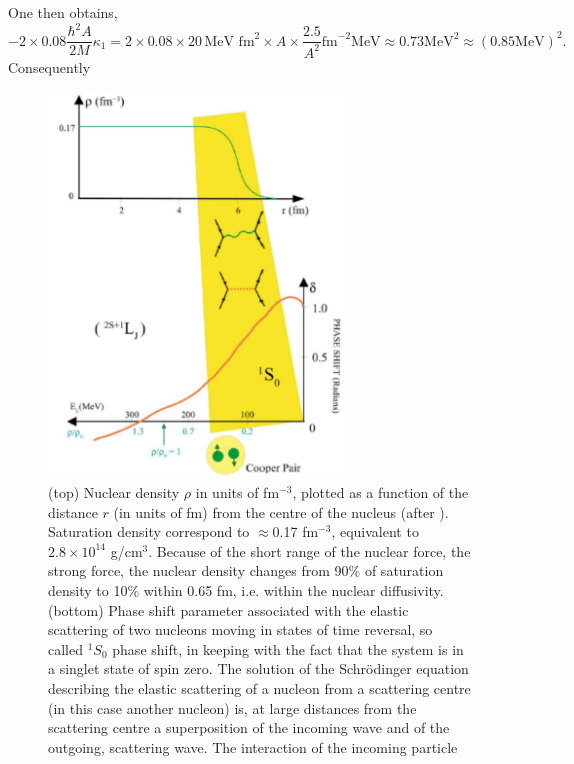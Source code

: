  One then obtains,
\begin{equation*}
-2\times 0.08\frac{\hbar^2A}{2M}\kappa_1=2\times 0.08\times 20\,\text{MeV fm}^2\times A\times\frac{2.5}{A^2}\text{fm}^{-2}\text{MeV}\approx 0.73 \text{MeV}^2\approx (0.85\text{MeV})^2.
\end{equation*} 
 Consequently
  \begin{figure}
  \centerline{\includegraphics*[width=0.7\textwidth,angle=0]{nutshell/figs/fig1F1.pdf}}\caption{(top) Nuclear density $\rho$ in units of fm$^{-3}$, plotted as a function of the distance $r$ (in units of fm) from
    the centre of the nucleus (after \cite{Bohr:69}). Saturation density correspond to $\approx$0.17 fm$^{-3}$, equivalent to $2.8\times 10^{14}$ g/cm$^3$. Because of the short range of
    the nuclear force, the strong force, the nuclear density changes from 90\% of saturation density to 10\% within 0.65 fm, i.e. within the
    nuclear diffusivity. (bottom) Phase shift  parameter associated with the elastic scattering of two nucleons moving in states of time reversal, so
    called $^1S_0$ phase shift, in keeping with the fact that the system is in a singlet state of spin zero. The solution of the Schr\"odinger equation
    describing the elastic scattering of a nucleon from a scattering centre (in this case another nucleon) is, at large distances from the
    scattering centre a superposition of the incoming wave and of the outgoing, scattering wave. The interaction of the incoming particle
}
\end{figure}
